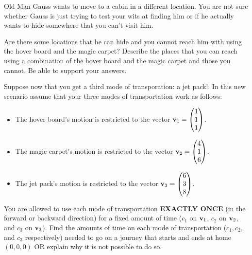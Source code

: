 \begin{problem}
    Old Man Gauss wants to move to a cabin in a different location.  You are not sure
    whether Gauss is just trying to test your wits at finding him or if he actually wants
    to hide somewhere that you can't visit him.  

    Are there some locations that he can hide and you cannot reach him with using the
    hover board and the magic carpet?  Describe the places that you can reach using a
    combination of the hover board and the magic carpet and those you cannot.  Be able to
    support your answers.
\end{problem}

\begin{problem}
    Suppose now that you get a third mode of transporation: a jet pack!.  In this new
    scenario assume that your three modes of transportation work as follows:
    \begin{itemize}
        \item The hover board's motion is restricted to the vector ${\bf v}_1 =
            \begin{pmatrix} 1\\1\\1\end{pmatrix}$.
        \item The magic carpet's motion is restricted to the vector ${\bf v}_2 =
            \begin{pmatrix} 4\\1\\6\end{pmatrix}$.
        \item The jet pack's motion is restricted to the vector ${\bf v}_3 =
            \begin{pmatrix} 6\\3\\8\end{pmatrix}$.
    \end{itemize}
    You are allowed to use each mode of transportation {\bf EXACTLY ONCE} (in the forward or
    backward direction) for a fixed amount of time ($c_1$ on ${\bf v}_1$, $c_2$ on ${\bf v}_2$,
    and $c_3$ on ${\bf v}_3$).  Find the amounts of time on each mode of transportation ($c_1,
    c_2,$ and $c_3$ respectively) needed to go on a journey that starts and ends at home
    $(0,0,0)$ OR explain why it is not possible to do so.
\end{problem}


